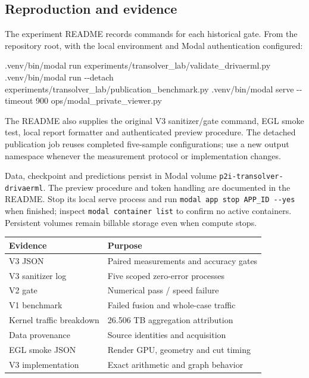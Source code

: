 \documentclass[
  10pt,
]{article}
\newenvironment{Shaded}{}{}
\newcommand{\AttributeTok}[1]{\textcolor[rgb]{0.49,0.56,0.16}{#1}}
\newcommand{\ExtensionTok}[1]{#1}
\newcommand{\NormalTok}[1]{#1}
\newcounter{none} %
\begin{document}
\subsection{Reproduction and evidence}\label{reproduction-and-evidence}

The experiment README records commands for each historical gate. From
the repository root, with the local environment and Modal authentication
configured:

\begin{Shaded}
\begin{Highlighting}[]
\ExtensionTok{.venv/bin/modal}\NormalTok{ run experiments/transolver\_lab/validate\_drivaerml.py}
\ExtensionTok{.venv/bin/modal}\NormalTok{ run }\AttributeTok{{-}{-}detach}\NormalTok{ experiments/transolver\_lab/publication\_benchmark.py}
\ExtensionTok{.venv/bin/modal}\NormalTok{ serve }\AttributeTok{{-}{-}timeout}\NormalTok{ 900 ops/modal\_private\_viewer.py}
\end{Highlighting}
\end{Shaded}

The README also supplies the original V3 sanitizer/gate command, EGL
smoke test, local report formatter and authenticated preview procedure.
The detached publication job reuses completed five-sample
configurations; use a new output namespace whenever the measurement
protocol or implementation changes.

Data, checkpoint and predictions persist in Modal volume
\texttt{p2i-transolver-drivaerml}. The preview procedure and token
handling are documented in the README. Stop its local serve process and
run \texttt{modal\ app\ stop\ APP\_ID\ -\/-yes} when finished; inspect
\texttt{modal\ container\ list} to confirm no active containers.
Persistent volumes remain billable storage even when compute stops.

{\def\LTcaptype{none} %
\begin{longtable}[]{@{}ll@{}}
\toprule\noalign{}
Evidence & Purpose \\
\midrule\noalign{}
\endhead
\bottomrule\noalign{}
\endlastfoot
V3 JSON & Paired measurements and accuracy gates \\
V3 sanitizer log & Five scoped zero-error processes \\
V2 gate & Numerical pass / speed failure \\
V1 benchmark & Failed fusion and whole-case traffic \\
Kernel traffic breakdown & 26.506 TB aggregation attribution \\
Data provenance & Source identities and acquisition \\
EGL smoke JSON & Render GPU, geometry and cut timing \\
V3 implementation & Exact arithmetic and graph behavior \\
\end{longtable}
}
\end{document}
